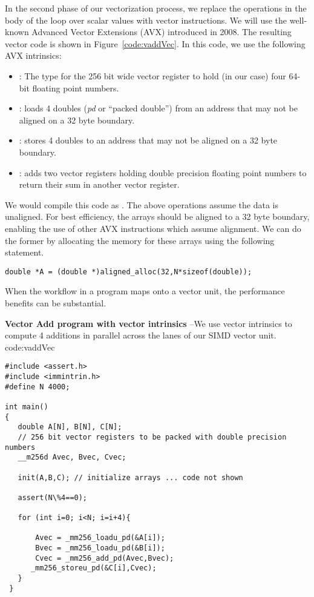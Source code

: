 In the second phase of our vectorization process, we replace the operations in the body of the loop over scalar values with vector instructions.
We will use the well-known Advanced Vector Extensions (AVX) introduced in 2008. The resulting vector code is
shown in Figure~\ref{code:vaddVec}.  In this code, we use the following AVX intrinsics:
\begin{itemize}
\item {}: The type for the 256 bit wide vector register to hold (in our case) four 64-bit floating point numbers.
\item {}:  loads 4 doubles (\emph{pd} or ``packed double'') from an address that may not be aligned on a 32 byte boundary.
\item {}:  stores 4 doubles to an address that may not be aligned on a 32 byte boundary.
\item {}: adds  two vector registers holding double precision floating point numbers to return 
their sum in another vector register.
\end{itemize}
We would compile this code as .  The above operations assume the data is unaligned.  
For best efficiency, the arrays  should be 
aligned to a 32 byte boundary, enabling the use of other AVX instructions which assume alignment.
We can do the former by allocating the memory for these arrays using the following statement.
\begin{verbatim}
double *A = (double *)aligned_alloc(32,N*sizeof(double));
\end{verbatim}
When the workflow in a program maps onto a vector unit, the performance 
benefits can be substantial.

\begin{CodeExample}%
{\textbf{Vector Add program with vector intrinsics} --\small We use vector intrinsics to compute 
4 additions in parallel across the lanes of our SIMD vector unit. 
}%
{code:vaddVec}
\begin{lstlisting}
#include <assert.h>
#include <immintrin.h>
#define N 4000;

int main()
{
   double A[N], B[N], C[N];
   // 256 bit vector registers to be packed with double precision numbers
   __m256d Avec, Bvec, Cvec;    
     
   init(A,B,C); // initialize arrays ... code not shown
   
   assert(N\%4==0);

   for (int i=0; i<N; i=i+4){

       Avec = _mm256_loadu_pd(&A[i]);
       Bvec = _mm256_loadu_pd(&B[i]);
       Cvec = _mm256_add_pd(Avec,Bvec);
      _mm256_storeu_pd(&C[i],Cvec);
   }
 }
\end{lstlisting}
\end{CodeExample}



